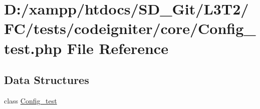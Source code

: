 \hypertarget{tests_2codeigniter_2core_2_config__test_8php}{}\section{D\+:/xampp/htdocs/\+S\+D\+\_\+\+Git/\+L3\+T2/\+F\+C/tests/codeigniter/core/\+Config\+\_\+test.php File Reference}
\label{tests_2codeigniter_2core_2_config__test_8php}
\subsection*{Data Structures}
\begin{DoxyCompactItemize}
\item 
class \hyperlink{class_config__test}{Config\+\_\+test}
\end{DoxyCompactItemize}
